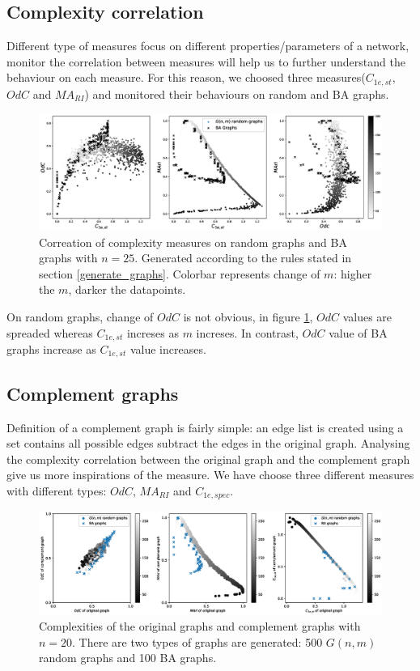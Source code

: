 \documentclass[12pt]{article}
\begin{document}
\subsection{Complexity correlation}
Different type of measures focus on different properties/parameters of a network, monitor the correlation between measures will help us to further understand the behaviour on each measure. For this reason, we choosed three measures($C_{1e,st}$,$OdC$ and $MA_{RI}$) and monitored their behaviours on random and BA graphs.\\
\begin{figure}[ht]
    \label{fig:correlation}
    \centering
    \includegraphics[width = 1.2\textwidth]{complexity_correlation.eps}
    \caption{Correation of complexity measures on random graphs and BA graphs with $n=25$. Generated according to the rules stated in section \ref{generate_graphs}. Colorbar represents change of $m$: higher the $m$, darker the datapoints.}
\end{figure}

\noindent
On random graphs, change of $OdC$ is not obvious, in figure \ref{fig:correlation}, $OdC$ values are spreaded whereas $C_{1e,st}$ increses as $m$ increses. In contrast, $OdC$ value of BA graphs increase as $C_{1e,st}$ value increases. 


\subsection{Complement graphs}
Definition of a complement graph is fairly simple: an edge list is created using a set contains all possible edges subtract the edges in the original graph. Analysing the complexity correlation between the original graph and the complement graph give us more inspirations of the measure. We have choose three different measures with different types: $OdC$, $MA_{RI}$ and $C_{1e,spec}$.
\begin{figure}[ht]
    \centering
    \label{fig:complement}
    \includegraphics[width = \textwidth]{complement.eps}
    \caption{Complexities of the original graphs and complement graphs with $n=20$. There are two types of graphs are generated: 500 $G(n,m)$ random graphs and 100 BA graphs.}
\end{figure}
\end{document}

